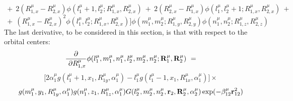 \[
\ +\ 2(R_{1,x}^\mu -R_{2,x}^\mu )\phi (l_1^\mu +1,l_2^\mu ;R_{1,x}^\mu
,R_{2,x}^\mu )\ +\ 2(R_{2,x}^\mu -R_{1,x}^\mu )\phi (l_1^\mu ,l_2^\mu
+1;R_{1,x}^\mu ,R_{2,x}^\mu )\ +\ 
\]
\begin{equation}
\ +\ (R_{1,x}^\mu -R_{2,x}^\mu )^2\phi (l_1^\mu ,l_2^\mu ;R_{1,x}^\mu
,R_{2,x}^\mu )\bigg] \phi (m_1^\mu ,m_2^\mu ;R_{1,y}^\mu ,R_{2,y}^\mu )\phi
(n_1^\mu ,n_2^\mu ;R_{1,z}^\mu ,R_{2,z}^\mu )
\end{equation}
The last derivative, to be considered in this section, is that with respect
to the orbital centers: 
\[
{\frac{{\partial }}{{\ \partial R_{1,x}^\mu }}}\phi (l_1^\mu ,m_1^\mu
,n_1^\mu ,l_2^\mu ,m_2^\mu ,n_2^\mu ;{\bf R}_1^\mu ,{\bf R}_2^\mu )\ =
\]
\[
\lbrack 2\alpha _1^\mu g(l_1^\mu +1,x_1,R_{1y}^\mu ,\alpha _1^\mu )-l_1^\mu
g(l_1^\mu -1,x_1,R_{1x}^\mu ,\alpha _1^\mu )]\times 
\]
\begin{equation}
g(m_1^\mu ,y_1,R_{1y}^\mu ,\alpha _1^\mu )g(n_1^\mu ,z_1,R_{1z}^\mu ,\alpha
_1^\mu )G(l_2^\mu ,m_2^\mu ,n_2^\mu ,{\bf r}_2,{\bf R}_2^\mu ,\alpha _2^\mu
)\exp (-\beta _{12}^\mu {\bf r}_{12}^2)
\end{equation}

